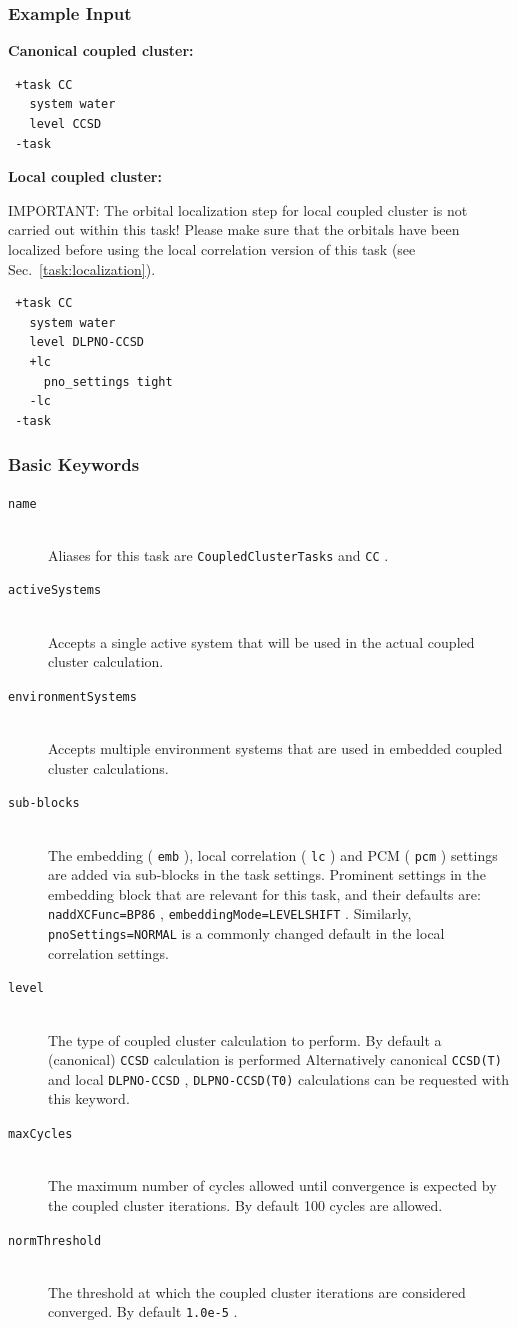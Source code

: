 \documentclass[bibliography=totocnumbered,a4paper,10pt,oneside]{scrbook}
\newcommand{\ttt}[1]{%
  \begingroup\setlength{\fboxsep}{1pt}%
  \colorbox{serenity-green!30}{\texttt{\hspace*{2pt}\vphantom{(g}#1\hspace*{2pt}}}%
  \endgroup
}
\begin{document}
\subsubsection{Example Input}
\textbf{Canonical coupled cluster:}
\begin{lstlisting}
 +task CC
   system water
   level CCSD
 -task
\end{lstlisting}
\textbf{Local coupled cluster:}

{\color{red}IMPORTANT: } The orbital localization step for local coupled cluster is not carried out
within this task! Please make sure that the orbitals have been localized before using the local
correlation version of this task (see Sec.~\ref{task:localization}).
\begin{lstlisting}
 +task CC
   system water
   level DLPNO-CCSD
   +lc
     pno_settings tight
   -lc
 -task
\end{lstlisting}
\subsubsection{Basic Keywords}
\begin{description}
 \item [\texttt{name}]\hfill \\
   Aliases for this task are \ttt{CoupledClusterTasks} and \ttt{CC}.
 \item [\texttt{activeSystems}]\hfill \\
   Accepts a single active system that will be used in the actual coupled cluster calculation.
 \item [\texttt{environmentSystems}]\hfill \\
   Accepts multiple environment systems that are used in embedded coupled cluster calculations.
 \item [\texttt{sub-blocks}]\hfill \\
   The embedding (\ttt{emb}), local correlation (\ttt{lc}) and PCM (\ttt{pcm}) settings are added via sub-blocks in the task settings.
   Prominent settings in the embedding block that are relevant for this task, and their defaults are:
   \ttt{naddXCFunc=BP86}, \ttt{embeddingMode=LEVELSHIFT}.
   Similarly, \ttt{pnoSettings=NORMAL} is a commonly changed default in the local correlation settings.
 \item [\texttt{level}]\hfill \\
   The type of coupled cluster calculation to perform. By default a (canonical) \ttt{CCSD} calculation is performed
   Alternatively canonical \ttt{CCSD(T)} and local \ttt{DLPNO-CCSD}, \ttt{DLPNO-CCSD(T0)} calculations can be
   requested with this keyword.
 \item [\texttt{maxCycles}]\hfill \\
   The maximum number of cycles allowed until convergence is expected by the coupled cluster iterations.
   By default 100 cycles are allowed.
 \item [\texttt{normThreshold}]\hfill \\
   The threshold at which the coupled cluster iterations are considered converged. By default \ttt{1.0e-5}.
\end{description}
\end{document}
